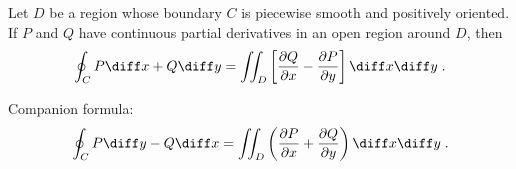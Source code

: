 \begin{frame}
\frametitle{\color{green}{Green's Theorem}}

\begin{theorem}[Green]
Let $D$ be a region whose boundary $C$ is piecewise smooth and positively oriented. If $P$ and $Q$ have continuous partial derivatives in an open region around $D$, then
\[\oint_C P \diff x + Q \diff y = \iint_D \left[\frac{\partial Q}{\partial x} - \frac{\partial P}{\partial y} \right] \diff x \diff y \; .
\]
\end{theorem}

Companion formula:
\[
\oint_C P\diff y - Q\diff x = \iint_D \left(\frac{\partial P}{\partial x} + \frac{\partial Q}{\partial y} \right) \diff x \diff y \; .
\]
\end{frame}